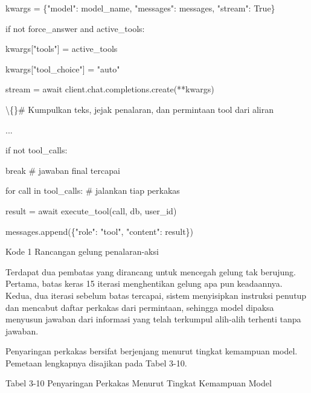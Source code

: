 \documentclass[12pt,a4paper]{article}
\begin{document}
kwargs = \{"model": model\_name, "messages": messages, "stream": True\}



if not force\_answer and active\_tools:



kwargs{[}"tools"{]} = active\_tools



kwargs{[}"tool\_choice"{]} = "auto"



stream = await client.chat.completions.create(**kwargs)



\textbackslash\{\}\# Kumpulkan teks, jejak penalaran, dan permintaan tool dari aliran



...



if not tool\_calls:



break                     \# jawaban final tercapai



for call in tool\_calls:       \# jalankan tiap perkakas



result = await execute\_tool(call, db, user\_id)



messages.append(\{"role": "tool", "content": result\})



Kode 1	Rancangan gelung penalaran-aksi



Terdapat dua pembatas yang dirancang untuk mencegah gelung tak berujung. Pertama, batas keras 15 iterasi menghentikan gelung apa pun keadaannya. Kedua, dua iterasi sebelum batas tercapai, sistem menyisipkan instruksi penutup dan mencabut daftar perkakas dari permintaan, sehingga model dipaksa menyusun jawaban dari informasi yang telah terkumpul alih-alih terhenti tanpa jawaban.



Penyaringan perkakas bersifat berjenjang menurut tingkat kemampuan model. Pemetaan lengkapnya disajikan pada Tabel 3-10.



Tabel 3-10	Penyaringan Perkakas Menurut Tingkat Kemampuan Model
\end{document}
